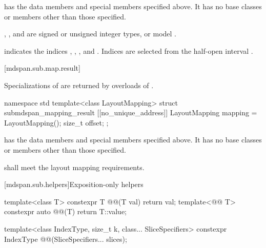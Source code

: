 \pnum
{} has the data members and special members specified above.
It has no base classes or members other than those specified.

\pnum
\mandates
{}, , and 
are signed or unsigned integer types, or
model .
\begin{note}
indicates the indices , , , and .
Indices are selected from the half-open interval .
\end{note}

[mdspan.sub.map.result]{}

\pnum
Specializations of 
are returned by overloads of .

%
\begin{codeblock}
namespace std {
  template<class LayoutMapping>
  struct submdspan_mapping_result {
    [[no_unique_address]] LayoutMapping mapping = LayoutMapping();
    size_t offset{};
  };
}
\end{codeblock}

\pnum
{} has
the data members and special members specified above.
It has no base classes or members other than those specified.

\pnum
{} shall meet
the layout mapping requirements.

[mdspan.sub.helpers]{Exposition-only helpers}

%
%
\begin{itemdecl}
template<class T>
  constexpr T @@(T val) { return val; }
template<@@ T>
  constexpr auto @@(T) { return T::value; }

template<class IndexType, size_t k, class... SliceSpecifiers>
  constexpr IndexType @@(SliceSpecifiers... slices);
\end{itemdecl}

